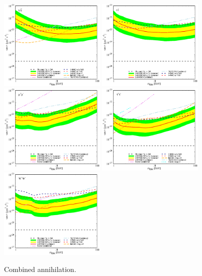 \documentclass[aps,prd,amsmath,amssymb,showpacs,floats,floatfix,nofootinbib,reprint]{revtex4-1}
\begin{document}
\begin{figure}%
\caption{Combined annihilation.}
{\includegraphics[width=0.45\textwidth]{annihilate_combined_bottom.eps}}
{\includegraphics[width=0.45\textwidth]{annihilate_combined_top.eps}}
{\includegraphics[width=0.45\textwidth]{annihilate_combined_mu.eps}}
{\includegraphics[width=0.45\textwidth]{annihilate_combined_tau.eps}}
{\includegraphics[width=0.45\textwidth]{annihilate_combined_ww.eps}}
\end{figure}
\end{document}
